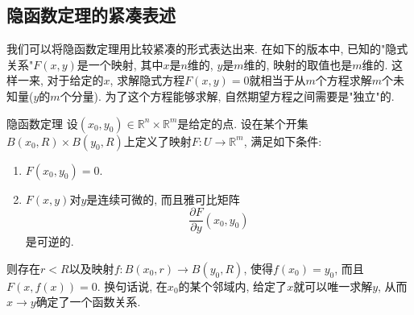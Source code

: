 

\subsection{隐函数定理的紧凑表述}
我们可以将隐函数定理用比较紧凑的形式表达出来. 在如下的版本中, 已知的"隐式关系"$F(x,y)$是一个映射, 其中$x$是$n$维的, $y$是$m$维的, 映射的取值也是$m$维的. 这样一来, 对于给定的$x$, 求解隐式方程$F(x,y)=0$就相当于从$m$个方程求解$m$个未知量($y$的$m$个分量). 为了这个方程能够求解, 自然期望方程之间需要是"独立"的.
\begin{theorem}{隐函数定理}
设$(x_0,y_0)\in\mathbb{R}^n\times\mathbb{R}^m$是给定的点. 设在某个开集$B(x_0,R)\times B(y_0,R)$上定义了映射$F:U\to\mathbb{R}^m$, 满足如下条件:
\begin{enumerate}
\item $F(x_0,y_0)=0$.
\item $F(x,y)$对$y$是连续可微的, 而且雅可比矩阵
$$
\frac{\partial F}{\partial y}(x_0,y_0)
$$
是可逆的.
\end{enumerate}
则存在$r<R$以及映射$f:B(x_0,r)\to B(y_0,R)$, 使得$f(x_0)=y_0$, 而且$F(x,f(x))=0$. 换句话说, 在$x_0$的某个邻域内, 给定了$x$就可以唯一求解$y$, 从而$x\to y$确定了一个函数关系.
\end{theorem}
